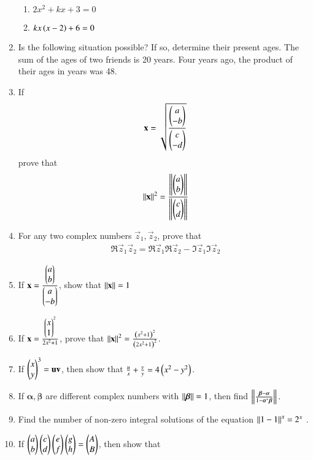 \begin{enumerate}[label=\arabic*.,ref=\thesubsection.\theenumi]
\begin{enumerate}
\item 	$2x^2+kx+3 = 0$
\item 	$kx\left(x-2\right)+6= 0$
\end{enumerate}
\item Is the following situation possible? If so, determine their present ages. The sum of the ages of two friends is 20 years. Four years ago, the product of their ages in years was 48.
%
\item If 
%
\begin{align}
\mathbf{x} = \sqrt{
\frac{\begin{pmatrix}a\\-b\end{pmatrix}}{\begin{pmatrix}c\\-d\end{pmatrix}}
}
\end{align}
prove that 
%
\begin{align}
\left\lVert\mathbf{x}\right\rVert^2 = \frac{
\left\lVert
\begin{pmatrix}a\\b\end{pmatrix}
\right\rVert
}
{
\left\lVert\begin{pmatrix}c\\d\end{pmatrix}\right\rVert
}
\end{align}
\item For any two complex numbers $\vec{z}_1, \vec{z}_2$, prove that 
%
\begin{align}
\Re{\vec{z}_1\vec{z}_2} = 
\Re{\vec{z}_1}
\Re{\vec{z}_2}-
\Im{\vec{z}_1}
\Im{\vec{z}_2}
\end{align}
\item If $\mathbf{x} = \frac{\begin{pmatrix}a\\b\end{pmatrix}}{\begin{pmatrix}a\\-b\end{pmatrix}}$, show that $\mathbf{\left\lVert x\right\rVert} = 1$
%
\item If $\mathbf{x} = \frac{\begin{pmatrix}x\\1\end{pmatrix}^2}{2x^2+1}$, prove that $\left\lVert\mathbf{x}\right\rVert^2 = \frac{\left(x^2+1\right)^2}{\left(2x^2+1\right)^2}$.
%
\item If $\begin{pmatrix}x\\y\end{pmatrix}^3 = \mathbf{u\\v}$, then show that $\frac{u}{x}+\frac{v}{y} = 4\left(x^2-y^2\right)$.
\item If $\bm{\alpha}, \bm{\beta}$ are different complex numbers with $\left\lVert\bm{\beta}\right\rVert=1$, then find $\left\lVert\frac{\bm{\beta}-\bm{\alpha}}{1-\bm{\alpha}^{*}\bm{\beta}}\right\rVert.$
\item Find the number of non-zero integral solutions of the equation $\left\lVert1\\-1\right\rVert^x = 2^x$ .
\item If $\begin{pmatrix} a\\ b\end{pmatrix}\begin{pmatrix}c \\ d\end{pmatrix}\begin{pmatrix}e \\ f\end{pmatrix}\begin{pmatrix}g \\ h\end{pmatrix} = \begin{pmatrix}A \\ B\end{pmatrix}$, then show that 

\end{enumerate}
